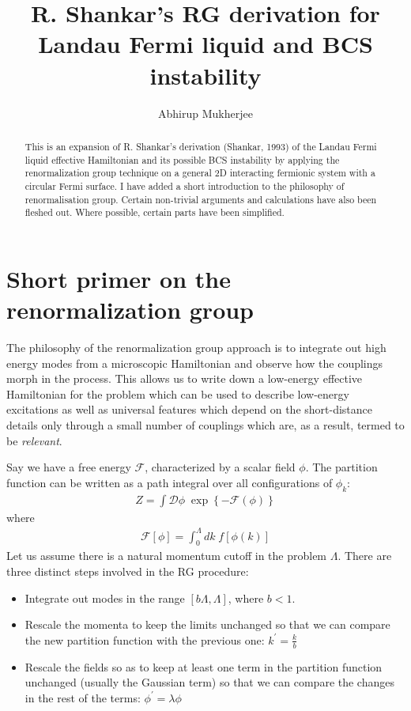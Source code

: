 \documentclass[12pt]{article}
\begin{document}
\title{\bf R. Shankar's RG derivation for Landau Fermi liquid and BCS instability}
\author{Abhirup Mukherjee}
\maketitle

\begin{abstract}
This is an expansion of R. Shankar's derivation (Shankar, 1993) of the Landau Fermi liquid effective Hamiltonian and its possible BCS instability by applying the renormalization group technique on a general 2D interacting fermionic system with a circular Fermi surface. I have added a short introduction to the philosophy of renormalisation group. Certain non-trivial arguments and calculations have also been fleshed out. Where possible, certain parts have been simplified.
\end{abstract}

\section{Short primer on the renormalization group}
The philosophy of the renormalization group approach is to integrate out high energy modes from a microscopic Hamiltonian and observe how the couplings morph in the process. This allows us to write down a low-energy effective Hamiltonian for the problem which can be used to describe low-energy excitations as well as universal features which depend on the short-distance details only through a small number of couplings which are, as a result, termed to be \textit{relevant}.

Say we have a free energy \(\mathcal{F}\), characterized by a scalar field \(\phi\). The partition function can be written as a path integral over all configurations of \(\phi_k\):
\begin{equation}\begin{aligned}
\label{oldpart}
Z = \int \mathcal{D}\phi \;\exp\left\{-\mathcal{F}(\phi)\right\}
\end{aligned}\end{equation}
where 
\begin{equation}\begin{aligned}
\mathcal{F}[\phi] = \int_0^\Lambda dk \;f[\phi(k)]
\end{aligned}\end{equation}
Let us assume there is a natural momentum cutoff in the problem \(\Lambda\). There are three distinct steps involved in the RG procedure:
\begin{itemize}
	\item Integrate out modes in the range \(\left[b\Lambda,\Lambda\right]\), where \(b < 1\).
	\item Rescale the momenta to keep the limits unchanged so that we can compare the new partition function with the previous one: \(k^\prime = \frac{k}{b}\)
	\item Rescale the fields so as to keep at least one term in the partition function unchanged (usually the Gaussian term) so that we can compare the changes in the rest of the terms: \(\phi^\prime = \lambda\phi\)
\end{itemize}
\end{document}

